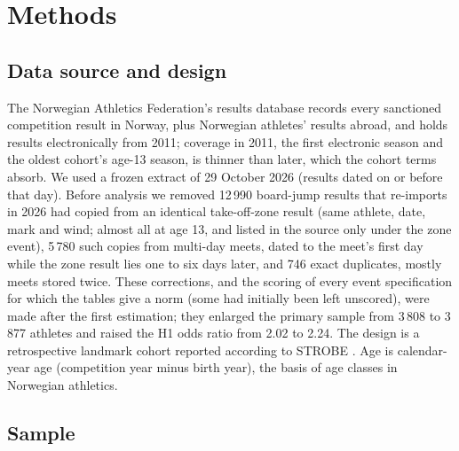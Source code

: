 \documentclass[12pt,a4paper]{article}
\begin{document}

\section{Methods}

\subsection{Data source and design}

The Norwegian Athletics Federation's results database records every sanctioned competition result in Norway, plus Norwegian athletes' results abroad, and holds results electronically from 2011; coverage in 2011, the first electronic season and the oldest cohort's age-13 season, is thinner than later, which the cohort terms absorb. We used a frozen extract of 29 October 2026 (results dated on or before that day). Before analysis we removed 12\,990 board-jump results that re-imports in 2026 had copied from an identical take-off-zone result (same athlete, date, mark and wind; almost all at age 13, and listed in the source only under the zone event), 5\,780 such copies from multi-day meets, dated to the meet's first day while the zone result lies one to six days later, and 746 exact duplicates, mostly meets stored twice. These corrections, and the scoring of every event specification for which the tables give a norm (some had initially been left unscored), were made after the first estimation; they enlarged the primary sample from 3\,808 to 3\,877 athletes and raised the H1 odds ratio from 2.02 to 2.24. The design is a retrospective landmark cohort reported according to STROBE \citep{vonelm2007}. Age is calendar-year age (competition year minus birth year), the basis of age classes in Norwegian athletics.

\subsection{Sample}
\end{document}
